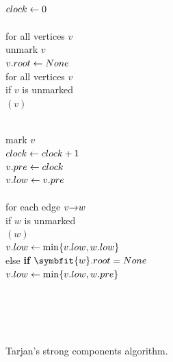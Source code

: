 \begin{figure}[ht]
\centering
\begin{minipage}[c]{0.42\linewidth}
\begin{pseudocode}
\\
$clock \gets 0$\\
\\
for all vertices $v$\\
\Indent unmark $v$\\
\Indent $v.root \gets None$\\
for all vertices $v$\\
\Indent if $v$ is unmarked\\
\Indent\Indent {}$(v)$
\end{pseudocode}
\end{minipage}\hfill
\begin{minipage}[c]{0.54\linewidth}
\begin{pseudocode}
\\
mark $v$\\
$clock \gets clock + 1$\\
$v.pre \gets clock$\\
$v.low \gets v.pre$\\
\\
for each edge $v\mathord{\rightarrow}w$\\
\Indent if $w$ is unmarked\\
\Indent\Indent {}$(w)$\\
\Indent\Indent $v.low \gets \min\{v.low, w.low\}$\\
\Indent else {\color{JEred}\bfseries if $\symbfit{w}.\Var{root} = \Const{None}$}\\
\Indent\Indent $v.low \gets \min\{v.low, w.pre\}$\\
\\
\\
\Indent{}\\
\Indent{}\\
\end{pseudocode}
\end{minipage}
\caption{Tarjan’s strong components algorithm.}
\label{fig:6.19}
\end{figure}

